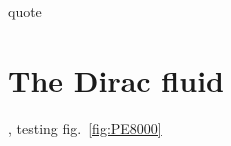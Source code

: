 \begin{savequote}[75mm]
quote
\end{savequote}

\chapter{The Dirac fluid}
\label{ch:the_dirac_fluid}

, testing
fig.~\ref{fig:PE8000}

